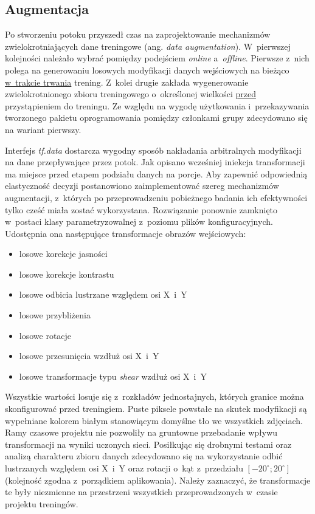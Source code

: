 \subsection{Augmentacja}

Po stworzeniu potoku przyszedł czas na zaprojektowanie mechanizmów zwielokrotniających dane treningowe (ang. \textit{data augmentation}). W~pierwszej kolejności należało wybrać pomiędzy podejściem \textit{online} a~\textit{offline}. Pierwsze z~nich polega na generowaniu losowych modyfikacji danych wejściowych na bieżąco \underline{w~trakcie trwania} trening. Z~kolei drugie zakłada wygenerowanie zwielokrotnionego zbioru treningowego o~określonej wielkości \underline{przed} przystąpieniem do treningu. Ze względu na wygodę użytkowania i~przekazywania tworzonego pakietu oprogramowania pomiędzy członkami grupy zdecydowano się na wariant pierwszy.

Interfejs \textit{tf.data} dostarcza wygodny sposób nakładania arbitralnych modyfikacji na dane przepływające przez potok. Jak opisano wcześniej iniekcja transformacji ma miejsce przed etapem podziału danych na porcje. Aby zapewnić odpowiednią elastyczność decyzji postanowiono zaimplementować szereg mechanizmów augmentacji, z~których po przeprowadzeniu pobieżnego badania ich efektywności tylko cześć miała zostać wykorzystana. Rozwiązanie ponownie zamknięto w~postaci klasy parametryzowalnej z~poziomu plików konfiguracyjnych. Udostępnia ona następujące transformacje obrazów wejściowych:

\begin{itemize}
    \setlength\itemsep{0.3em}
    \item losowe korekcje jasności
    \item losowe korekcje kontrastu
    \item losowe odbicia lustrzane względem osi X~i~Y
    \item losowe przybliżenia
    \item losowe rotacje
    \item losowe przesunięcia wzdłuż osi X~i~Y
    \item losowe transformacje typu \textit{shear} wzdłuż osi X~i~Y
\end{itemize}

Wszystkie wartości losuje się z~rozkładów jednostajnych, których granice można skonfigurować przed treningiem. Puste piksele powstałe na skutek modyfikacji są wypełniane kolorem białym stanowiącym domyślne tło we wszystkich zdjęciach. Ramy czasowe projektu nie pozwoliły na gruntowne przebadanie wpływu transformacji na wyniki uczonych sieci. Posiłkując się drobnymi testami oraz analizą charakteru zbioru danych zdecydowano się na wykorzystanie odbić lustrzanych względem osi X~i~Y oraz rotacji o~kąt z~przedziału $[-20^{\circ}; 20^{\circ}]$  (kolejność zgodna z~porządkiem aplikowania). Należy zaznaczyć, że transformacje te były niezmienne na przestrzeni wszystkich przeprowadzonych w~czasie projektu treningów.

